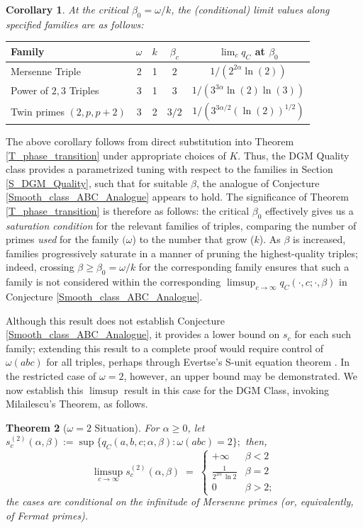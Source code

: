 \documentclass[11pt,letterpaper]{amsart}
\newtheorem{theorem}{Theorem}[section]
\newtheorem{corollary}[theorem]{Corollary}
\def\ra{\rightarrow}
\begin{document}
\begin{corollary}\label{C_4_5}
At the critical $\beta_0=\omega/k$, the (conditional) limit values along specified families are as follows:
\end{corollary}
\begin{center}\small
\begin{tabular}{|l|c|c|c|c|}
\hline
Family & $\omega$ & $k$ & $\beta_c$ & $\lim_{c} q_C$ at $\beta_0$ \\
\hline
Mersenne Triple & 2 & 1 & $2$ & $1/(2^{2\alpha}\ln(2))$ \\
Power of $2,3$ Triples & 3 & 1 & $3$ & $1/(3^{3\alpha}\ln(2) \ln(3))$ \\
Twin primes $(2,p,p\!+\!2)$ & 3 & 2 & $3/2$ & $1/(3^{3\alpha/2}(\ln(2))^{1/2})$ \\
\hline
\end{tabular}
\end{center}

The above corollary follows from direct substitution into Theorem \ref{T_phase_transition} under appropriate choices of $K$. Thus, the DGM Quality class  provides a parametrized tuning with respect to the families in Section \ref{S_DGM_Quality}, such that for suitable $\beta$, the analogue of Conjecture \ref{Smooth_class_ABC_Analogue} appears to hold. The significance of Theorem \ref{T_phase_transition} is therefore as follows: the critical $\beta_0$ effectively gives us a \textit{saturation condition} for the relevant families of triples, comparing the number of primes \textit{used} for the family $(\omega$) to the number that grow ($k$). As $\beta$ is increased, families progressively saturate in a manner of pruning the highest-quality triples; indeed, crossing $\beta \ge \beta_0 = \omega/k$ for the corresponding family ensures that such a family is not considered within the corresponding $\limsup_{c \ra \infty} q_C(\cdot, c; \cdot,  \beta)$ in Conjecture \ref{Smooth_class_ABC_Analogue}. 

Although this result does not establish Conjecture \ref{Smooth_class_ABC_Analogue}, it provides a lower bound on $s_c$ for each such family; extending this result to a complete proof would require control of $\omega(abc)$ for all triples, perhaps through Evertse's S-unit equation theorem \cite{granville2002}. In the restricted case of $\omega = 2$, however, an upper bound may be demonstrated. We now establish this $\limsup$ result in this case for the DGM Class, invoking Milailescu's Theorem, as follows.

\begin{theorem}[$\omega=2$ Situation]\label{T_omega2_trichotomy}
For $\alpha\ge 0$, let $s_c^{(2)}(\alpha,\beta) := \sup\{q_C(a,b,c;\alpha,\beta):\omega(abc)=2\};$ then,
\[
\limsup_{c\to\infty} s_c^{(2)}(\alpha,\beta) \;=\;
\begin{cases}
+\infty & \beta<2\\
\frac{1}{2^{2\alpha}\,\ln 2} & \beta=2\\
0 & \beta>2;
\end{cases}
\]
the cases are conditional on the infinitude of Mersenne primes (or, equivalently, of Fermat primes).   
\end{theorem}
\end{document}
